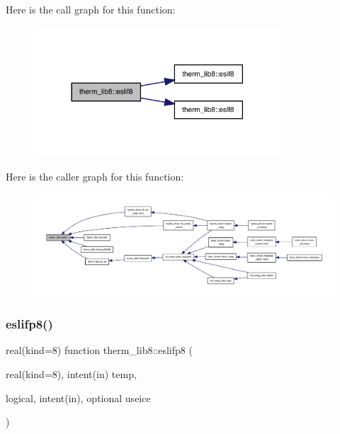 Here is the call graph for this function\+:
\nopagebreak
\begin{figure}[H]
\begin{center}
\leavevmode
\includegraphics[width=261pt]{namespacetherm__lib8_a1b4385a0130e311cf955294b6ae00f7a_cgraph}
\end{center}
\end{figure}
Here is the caller graph for this function\+:
\nopagebreak
\begin{figure}[H]
\begin{center}
\leavevmode
\includegraphics[width=350pt]{namespacetherm__lib8_a1b4385a0130e311cf955294b6ae00f7a_icgraph}
\end{center}
\end{figure}
\mbox{\label{namespacetherm__lib8_ae0d53f4e0871d19461d34b59cc932516}} 
\subsubsection{\texorpdfstring{eslifp8()}{eslifp8()}}
{\footnotesize\ttfamily real(kind=8) function therm\+\_\+lib8\+::eslifp8 (\begin{DoxyParamCaption}\item[{real(kind=8), intent(in)}]{temp,  }\item[{logical, intent(in), optional}]{useice }\end{DoxyParamCaption})}

